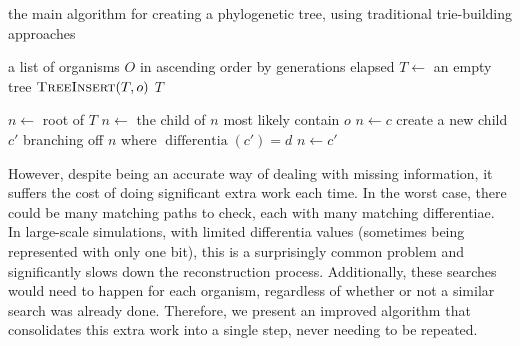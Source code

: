 \begin{algorithm}[h]
    \caption{the main algorithm for creating a phylogenetic tree, using traditional trie-building approaches}
    \label{alg:old}
    \begin{algorithmic}[1]
        \Require a list of organisms $O$ in ascending order by generations elapsed
            \State $T \gets$ an empty tree
                \State $\textsc{TreeInsert}(T, o)$
            \EndFor
            \State \Return $T$
        \EndFunction

            \State $n \gets$ root of $T$
                    \State $n \gets$ the child of $n$ most likely contain $o$
                \EndWhile
                    \State $n \gets c$
                \Else 
                    \State create a new child $c'$ branching off $n$ where $\operatorname{differentia}(c') = d$
                    \State $n \gets c'$
                \EndIf
            \EndFor
        \EndFunction
    \end{algorithmic}
\end{algorithm}

However, despite being an accurate way of dealing with missing information, it suffers the cost of doing significant extra work each time. In the worst case, there could be many matching paths to check, each with many matching differentiae. In large-scale simulations, with limited differentia values (sometimes being represented with only one bit), this is a surprisingly common problem and significantly slows down the reconstruction process. Additionally, these searches would need to happen for each organism, regardless of whether or not a similar search was already done. Therefore, we present an improved algorithm that consolidates this extra work into a single step, never needing to be repeated.